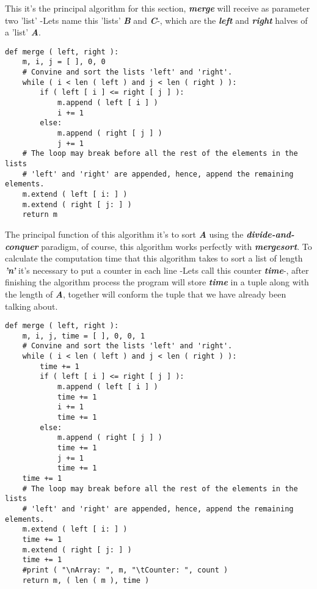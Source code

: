 This it's the principal algorithm for this section, {\bfseries\itshape merge} will receive as parameter two 'list' -Lets name this 'lists' {\bfseries\itshape B} and {\bfseries\itshape C}-, which are the {\bfseries\itshape left} and {\bfseries\itshape right} halves of a 'list' {\bfseries\itshape A}. \hfill \break

\begin{lstlisting}
def merge ( left, right ):
    m, i, j = [ ], 0, 0
    # Convine and sort the lists 'left' and 'right'.
    while ( i < len ( left ) and j < len ( right ) ):
        if ( left [ i ] <= right [ j ] ):
            m.append ( left [ i ] )
            i += 1
        else:
            m.append ( right [ j ] )
            j += 1
    # The loop may break before all the rest of the elements in the lists
    # 'left' and 'right' are appended, hence, append the remaining elements.
    m.extend ( left [ i: ] )
    m.extend ( right [ j: ] )
    return m
\end{lstlisting} \hfill

The principal function of this algorithm it's to sort {\bfseries\itshape A} using the {\bfseries\itshape divide-and-conquer} paradigm, of course, this algorithm works perfectly with {\bfseries\itshape mergesort}. To calculate the computation time that this algorithm takes to sort a list of length {\bfseries\itshape 'n'} it's necessary to put a counter in each line -Lets call this counter {\bfseries\itshape time}-, after finishing the algorithm process the program will store {\bfseries\itshape time} in a tuple along with the length of {\bfseries\itshape A}, together will conform the tuple that we have already been talking about. \hfill \break

\begin{lstlisting}
def merge ( left, right ):
    m, i, j, time = [ ], 0, 0, 1
    # Convine and sort the lists 'left' and 'right'.
    while ( i < len ( left ) and j < len ( right ) ):
        time += 1
        if ( left [ i ] <= right [ j ] ):
            m.append ( left [ i ] )
            time += 1
            i += 1
            time += 1
        else:
            m.append ( right [ j ] )
            time += 1
            j += 1
            time += 1
    time += 1
    # The loop may break before all the rest of the elements in the lists
    # 'left' and 'right' are appended, hence, append the remaining elements.
    m.extend ( left [ i: ] )
    time += 1
    m.extend ( right [ j: ] )
    time += 1
    #print ( "\nArray: ", m, "\tCounter: ", count )
    return m, ( len ( m ), time )
\end{lstlisting} \hfill

\pagebreak